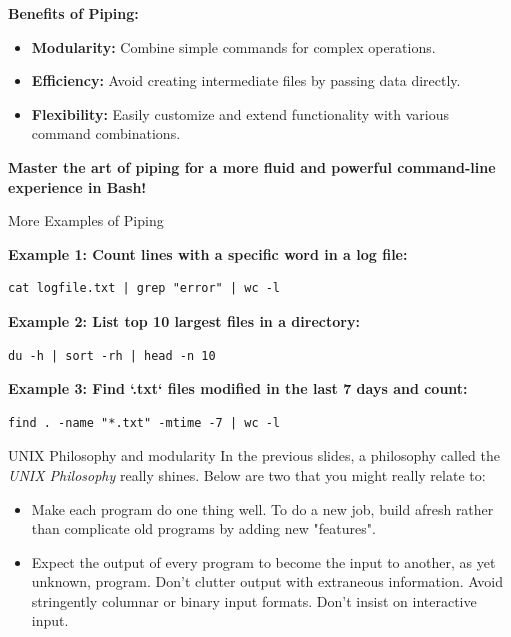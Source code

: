 \documentclass{beamer}
\begin{document}
\begin{frame}{\textbf{Benefits of Piping:}}
  \begin{itemize}
    \item \textbf{Modularity:} Combine simple commands for complex operations.
    \item \textbf{Efficiency:} Avoid creating intermediate files by passing data directly.
    \item \textbf{Flexibility:} Easily customize and extend functionality with various command combinations.
  \end{itemize}

  \textbf{Master the art of piping for a more fluid and powerful command-line experience in Bash!}

\end{frame}

\begin{frame}[fragile]{More Examples of Piping}

  \textbf{Example 1: Count lines with a specific word in a log file:}
  \begin{lstlisting}[frame=none]
  cat logfile.txt | grep "error" | wc -l
  \end{lstlisting}

  \textbf{Example 2: List top 10 largest files in a directory:}
  \begin{lstlisting}[frame=none]
  du -h | sort -rh | head -n 10
  \end{lstlisting}

  \textbf{Example 3: Find `.txt` files modified in the last 7 days and count:}
  \begin{lstlisting}[frame=none]
  find . -name "*.txt" -mtime -7 | wc -l
  \end{lstlisting}

\end{frame}

\begin{frame}{UNIX Philosophy and modularity}
    In the previous slides, a philosophy called the \textit{UNIX Philosophy} really shines. Below are two that you might really relate to:
    \begin{itemize}
        \item Make each program do one thing well. To do a new job, build afresh rather than complicate old programs by adding new "features".
        \item Expect the output of every program to become the input to another, as yet unknown, program. Don't clutter output with extraneous information. Avoid stringently columnar or binary input formats. Don't insist on interactive input.
    \end{itemize}
\end{frame}
\end{document}
